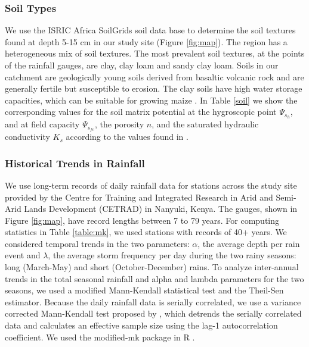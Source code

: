 \subsubsection{Soil Types}
We use the ISRIC Africa SoilGrids soil data base \cite{isric} to determine the soil textures found at depth 5-15 cm in our study site (Figure \ref{fig:map}). The region has a heterogeneous mix of soil textures. The most prevalent soil textures, at the points of the rainfall gauges, are clay, clay loam and sandy clay loam. Soils in our catchment are geologically young soils derived from basaltic volcanic rock and are generally fertile but susceptible to erosion. The clay soils have high water storage capacities, which can be suitable for growing maize \cite{muchena1988soils}. In Table \ref{soil} we show the corresponding values for the soil matrix potential at the hygroscopic point $\Psi_{s_{h}}$, and at field capacity $\Psi_{s_{fc}}$, the porosity $n$, and the saturated hydraulic conductivity $K_s$ according to the values found in .

\subsubsection{Historical Trends in Rainfall} \label{historic-rainfall}

We use long-term records of daily rainfall data for stations across the study site provided by the Centre for Training and Integrated Research in Arid and Semi-Arid Lands Development (CETRAD) in Nanyuki, Kenya. The gauges, shown in Figure \ref{fig:map}, have record lengths between 7 to 79 years. For computing statistics in Table \ref{table:mk}, we used stations with records of 40+ years. We considered temporal trends in the two parameters: $\alpha$, the average depth per rain event and $\lambda$, the average storm frequency per day during the two rainy seasons: long (March-May) and short (October-December) rains. To analyze inter-annual trends in the total seasonal rainfall and alpha and lambda parameters for the two seasons, we used a modified Mann-Kendall statistical test and the Theil-Sen estimator. Because the daily rainfall data is serially correlated, we use a variance corrected Mann-Kendall test proposed by , which detrends the serially correlated data and calculates an effective sample size using the lag-1 autocorrelation coefficient. We used the modified-mk package in R \cite{mmk}. 

